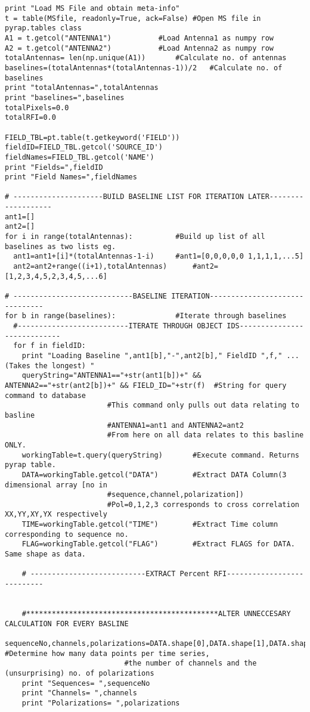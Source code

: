 \begin{verbatim}
print "Load MS File and obtain meta-info"
t = table(MSfile, readonly=True, ack=False)	#Open MS file in pyrap.tables class
A1 = t.getcol("ANTENNA1")			#Load Antenna1 as numpy row
A2 = t.getcol("ANTENNA2")			#Load Antenna2 as numpy row
totalAntennas= len(np.unique(A1))		#Calculate no. of antennas
baselines=(totalAntennas*(totalAntennas-1))/2	#Calculate no. of baselines
print "totalAntennas=",totalAntennas
print "baselines=",baselines
totalPixels=0.0
totalRFI=0.0

FIELD_TBL=pt.table(t.getkeyword('FIELD'))
fieldID=FIELD_TBL.getcol('SOURCE_ID')
fieldNames=FIELD_TBL.getcol('NAME')
print "Fields=",fieldID
print "Field Names=",fieldNames

# ---------------------BUILD BASELINE LIST FOR ITERATION LATER-------------------
ant1=[]
ant2=[]
for i in range(totalAntennas):			#Build up list of all baselines as two lists eg.
  ant1=ant1+[i]*(totalAntennas-1-i)		#ant1=[0,0,0,0,0 1,1,1,1,...5]
  ant2=ant2+range((i+1),totalAntennas)		#ant2=[1,2,3,4,5,2,3,4,5,...6]
  
# ----------------------------BASELINE ITERATION-------------------------------
for b in range(baselines):				#Iterate through baselines
  #--------------------------ITERATE THROUGH OBJECT IDS----------------------------
  for f in fieldID:
    print "Loading Baseline ",ant1[b],"-",ant2[b]," FieldID ",f," ...(Takes the longest) "
    queryString="ANTENNA1=="+str(ant1[b])+" && ANTENNA2=="+str(ant2[b])+" && FIELD_ID="+str(f)	#String for query command to database	
						#This command only pulls out data relating to basline
						#ANTENNA1=ant1 and ANTENNA2=ant2
						#From here on all data relates to this basline ONLY.
    workingTable=t.query(queryString)		#Execute command. Returns pyrap table.
    DATA=workingTable.getcol("DATA")		#Extract DATA Column(3 dimensional array [no in 
						#sequence,channel,polarization])
						#Pol=0,1,2,3 corresponds to cross correlation XX,YY,XY,YX respectively
    TIME=workingTable.getcol("TIME")		#Extract Time column corresponding to sequence no.
    FLAG=workingTable.getcol("FLAG")		#Extract FLAGS for DATA. Same shape as data.

    # ---------------------------EXTRACT Percent RFI---------------------------

    
    #*********************************************ALTER UNNECCESARY CALCULATION FOR EVERY BASLINE
    sequenceNo,channels,polarizations=DATA.shape[0],DATA.shape[1],DATA.shape[2] #Determine how many data points per time series, 
							#the number of channels and the (unsurprising) no. of polarizations
    print "Sequences= ",sequenceNo
    print "Channels= ",channels
    print "Polarizations= ",polarizations
    

\end{verbatim}
